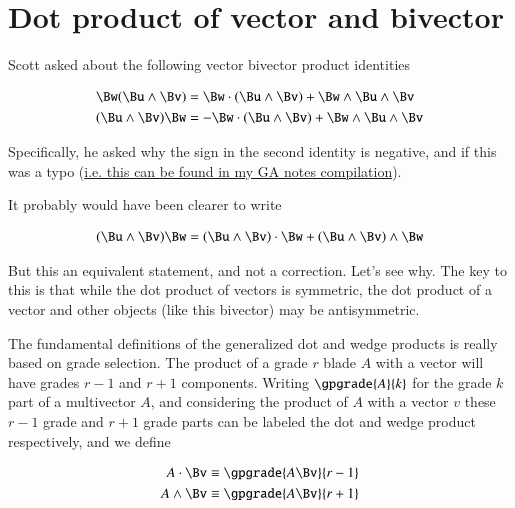 %

\chapter{Dot product of vector and bivector}
\label{chap:dotBlade}
{}
\date{Aug 11, 2009}

\beginArtNoToc

Scott asked about the following vector bivector product identities

\begin{align}
\Bw (\Bu \wedge \Bv) &= \Bw \cdot (\Bu \wedge \Bv) + \Bw \wedge \Bu \wedge \Bv \\
(\Bu \wedge \Bv) \Bw &= - \Bw \cdot (\Bu \wedge \Bv) + \Bw \wedge \Bu \wedge \Bv
\end{align}

Specifically, he asked why the sign in the second identity is negative, and if this was a typo (\href{http://sites.google.com/site/peeterjoot/math2009/gabook.pdf}{i.e. this can be found in my GA notes compilation}).

It probably would have been clearer to write

\begin{align*}
(\Bu \wedge \Bv) \Bw = (\Bu \wedge \Bv) \cdot \Bw + (\Bu \wedge \Bv) \wedge \Bw
\end{align*}

But this an equivalent statement, and not a correction.  Let's see why.  The key to this is that while the dot product of vectors is symmetric, the dot product of a vector and other objects (like this bivector) may be antisymmetric.

The fundamental definitions of the generalized dot and wedge products is really based on grade selection.  The product of a grade $r$ blade $A$ with a vector will have grades $r-1$ and $r+1$ components.  Writing $\gpgrade{A}{k}$ for the grade $k$ part of a multivector $A$, and considering the product of $A$ with a vector $v$ these $r-1$ grade and $r+1$ grade parts can be labeled the dot and wedge product respectively, and we define

\begin{align}\label{eqn:dotWedgeDefined}
A \cdot \Bv &\equiv \gpgrade{A \Bv}{r-1} \\
A \wedge \Bv &\equiv \gpgrade{A \Bv}{r+1} 
\end{align}

